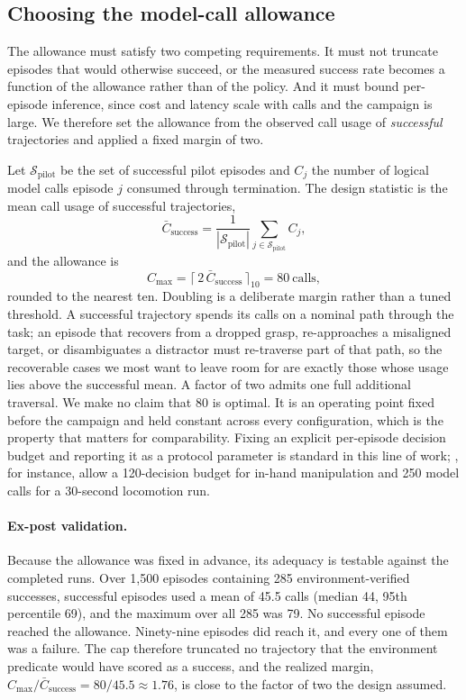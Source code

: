 \documentclass[11pt]{article}
\begin{document}
\subsection{Choosing the model-call allowance}
\label{sec:callbudget}
The allowance must satisfy two competing requirements. It must not truncate
episodes that would otherwise succeed, or the measured success rate becomes a
function of the allowance rather than of the policy. And it must bound
per-episode inference, since cost and latency scale with calls and the campaign
is large. We therefore set the allowance from the observed call usage of
\emph{successful} trajectories and applied a fixed margin of two.

Let $\mathcal{S}_{\mathrm{pilot}}$ be the set of successful pilot episodes and
$C_j$ the number of logical model calls episode $j$ consumed through
termination. The design statistic is the mean call usage of successful
trajectories,
\begin{equation}
\bar C_{\mathrm{success}}
=\frac{1}{|\mathcal{S}_{\mathrm{pilot}}|}
\sum_{j\in\mathcal{S}_{\mathrm{pilot}}}C_j ,
\label{eq:cbar}
\end{equation}
and the allowance is
\begin{equation}
C_{\max}=\big\lceil\,2\,\bar C_{\mathrm{success}}\,\big\rceil_{10}=80\ \text{calls},
\label{eq:budget}
\end{equation}
rounded to the nearest ten. Doubling is a deliberate margin rather than a tuned
threshold. A successful trajectory spends its calls on a nominal path through
the task; an episode that recovers from a dropped grasp, re-approaches a
misaligned target, or disambiguates a distractor must re-traverse part of that
path, so the recoverable cases we most want to leave room for are exactly those
whose usage lies above the successful mean. A factor of two admits one full
additional traversal. We make no claim that 80 is optimal. It is an operating
point fixed before the campaign and held constant across every configuration,
which is the property that matters for comparability. Fixing an explicit
per-episode decision budget and reporting it as a protocol parameter is
standard in this line of work; \citet{galbot2026astra}, for instance, allow a
120-decision budget for in-hand manipulation and 250 model calls for a
30-second locomotion run.

\paragraph{Ex-post validation.}
Because the allowance was fixed in advance, its adequacy is testable against
the completed runs. Over 1,500 episodes containing 285 environment-verified
successes, successful episodes used a mean of 45.5 calls (median 44, 95th
percentile 69), and the maximum over all 285 was 79. No successful episode
reached the allowance. Ninety-nine episodes did reach it, and every one of them
was a failure. The cap therefore truncated no trajectory that the environment
predicate would have scored as a success, and the realized margin,
$C_{\max}/\bar C_{\mathrm{success}}=80/45.5\approx1.76$, is close to the factor
of two the design assumed.
\end{document}

